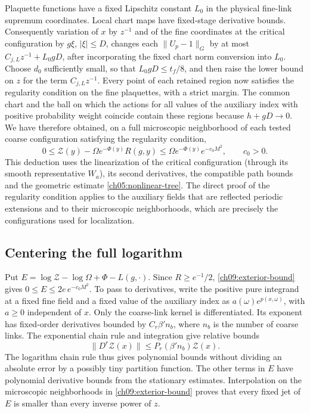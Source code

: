 Plaquette functions have a fixed Lipschitz constant $L_0$ in the
physical fine-link supremum coordinates. Local chart maps have
fixed-stage derivative bounds. Consequently variation of $x$ by
$z^{-1}$ and of the fine coordinates at the critical configuration by $g\xi$,
$|\xi|\le D$, changes each $\|U_p-1\|_G$ by at most
$C_{j,L}z^{-1}+L_0gD$, after incorporating the fixed chart norm
conversion into $L_0$. Choose $d_0$ sufficiently small, so that
$L_0gD\le t_f/8$, and then raise the lower bound on $z$ for the term
$C_{j,L}z^{-1}$. Every point of each retained region now satisfies the regularity condition on the fine plaquettes,
with a strict margin. The common chart and the ball on which the actions for all values of the auxiliary index with positive probability weight coincide
contain these regions because $h+gD\to0$.
We have therefore obtained, on a full microscopic neighborhood of
each tested coarse configuration satisfying the regularity condition,
\begin{equation}
 0\le\mathscr Z(y)-\Omega e^{-\Phi(y)}R(g,y)
       \le\Omega e^{-\Phi(y)}e^{-c_0M^2},\qquad c_0>0.
 \label{ch09:exterior-bound}
\end{equation}
This deduction uses the linearization of the critical configuration (through its smooth representative $W_a$), its second
derivatives, the compatible path bounds and the geometric
estimate \eqref{ch05:nonlinear-tree}. The direct proof of the regularity condition applies to the
auxiliary fields that are reflected periodic extensions and to their microscopic neighborhoods, which
are precisely the configurations used for localization.

\subsection{Centering the full logarithm}
\label{ch09:centered-log}

Put $E=\log\mathscr Z-\log\Omega+\Phi-L(g,\cdot)$.
Since $R\ge e^{-1}/2$, \eqref{ch09:exterior-bound} gives
$0\le E\le2e\,e^{-c_0M^2}$. To pass to derivatives, write
the positive pure integrand at a fixed fine field and a fixed value of the auxiliary index as
$a(\omega)e^{p(x,\omega)}$, with $a\ge0$ independent of $x$.
Only the coarse-link kernel is differentiated. Its exponent has
fixed-order derivatives bounded by $C_r\beta' n_b$, where
$n_b$ is the number of coarse links. The exponential chain rule
and integration give relative bounds
\[
 \|D^r\mathscr Z(x)\|\le P_r(\beta'n_b)\mathscr Z(x).
\]
The logarithm chain rule thus gives polynomial bounds without
dividing an absolute error by a possibly tiny partition function.
The other terms in $E$ have polynomial derivative bounds from the
stationary estimates. Interpolation on the microscopic neighborhoods
in \eqref{ch09:exterior-bound} proves that every fixed jet of $E$
is smaller than every inverse power of $z$.


